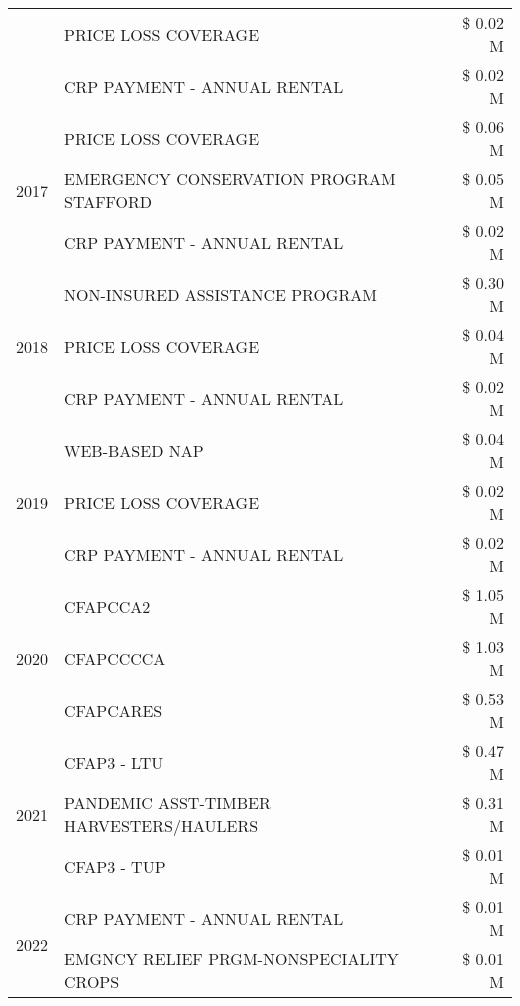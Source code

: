\begin{tabular}{llr}
 & PRICE LOSS COVERAGE & \$ 0.02 M \\
 & CRP PAYMENT - ANNUAL RENTAL & \$ 0.02 M \\
\cline{1-3}
\multirow[t]{3}{*}{2017} & PRICE LOSS COVERAGE & \$ 0.06 M \\
 & EMERGENCY CONSERVATION PROGRAM STAFFORD & \$ 0.05 M \\
 & CRP PAYMENT - ANNUAL RENTAL & \$ 0.02 M \\
\cline{1-3}
\multirow[t]{3}{*}{2018} & NON-INSURED ASSISTANCE PROGRAM & \$ 0.30 M \\
 & PRICE LOSS COVERAGE & \$ 0.04 M \\
 & CRP PAYMENT - ANNUAL RENTAL & \$ 0.02 M \\
\cline{1-3}
\multirow[t]{3}{*}{2019} & WEB-BASED NAP & \$ 0.04 M \\
 & PRICE LOSS COVERAGE & \$ 0.02 M \\
 & CRP PAYMENT - ANNUAL RENTAL & \$ 0.02 M \\
\cline{1-3}
\multirow[t]{3}{*}{2020} & CFAPCCA2 & \$ 1.05 M \\
 & CFAPCCCCA & \$ 1.03 M \\
 & CFAPCARES & \$ 0.53 M \\
\cline{1-3}
\multirow[t]{3}{*}{2021} & CFAP3 - LTU & \$ 0.47 M \\
 & PANDEMIC ASST-TIMBER HARVESTERS/HAULERS & \$ 0.31 M \\
 & CFAP3 - TUP & \$ 0.01 M \\
\cline{1-3}
\multirow[t]{2}{*}{2022} & CRP PAYMENT - ANNUAL RENTAL & \$ 0.01 M \\
 & EMGNCY RELIEF PRGM-NONSPECIALITY CROPS & \$ 0.01 M \\
\cline{1-3}
\bottomrule
\end{tabular}
